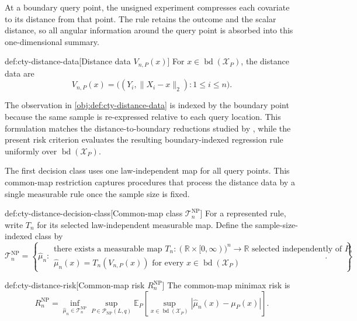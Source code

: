 At a boundary query point, the unsigned experiment compresses each covariate to its distance from that point. The rule retains the outcome and the scalar distance, so all angular information around the query point is absorbed into this one-dimensional summary.

\begin{definitionv}{def:cty-distance-data}[Distance data $V_{n,P}(x)$]
For \(x\in\operatorname{bd}(\mathcal X_P)\), the distance data are
\[
V_{n,P}(x)
=
\bigl((Y_i,\lVert X_i-x\rVert_2):1\leq i\leq n\bigr).
\]
\end{definitionv}

The observation in \cref{obj:def:cty-distance-data} is indexed by the boundary point because the same sample is re-expressed relative to each query location. This formulation matches the distance-to-boundary reductions studied by \citet{CattaneoTitiunikYu2026Distance}, while the present risk criterion evaluates the resulting boundary-indexed regression rule uniformly over \(\operatorname{bd}(\mathcal X_P)\).

The first decision class uses one law-independent map for all query points. This common-map restriction captures procedures that process the distance data by a single measurable rule once the sample size is fixed.

\begin{definitionv}{def:cty-distance-decision-class}[Common-map class $\mathcal T_n^{\mathrm{NP}}$]
For a represented rule, write \(T_n\) for its selected law-independent measurable map. Define the sample-size-indexed class by
\[
\mathcal T_n^{\mathrm{NP}}
=
\left\{
\widehat\mu_n:
\begin{array}{l}
\text{there exists a measurable map }T_n:(\mathbb R\times[0,\infty))^n\to\mathbb R
\text{ selected independently of }P,\\
\widehat\mu_n(x)=T_n(V_{n,P}(x))
\text{ for every }x\in\operatorname{bd}(\mathcal X_P)
\end{array}
\right\}.
\]
\end{definitionv}

\begin{definitionv}{def:cty-distance-risk}[Common-map risk $R_n^{\mathrm{NP}}$]
The common-map minimax risk is
\[
R_n^{\mathrm{NP}}
=
\inf_{\widehat\mu_n\in\mathcal T_n^{\mathrm{NP}}}
\sup_{P\in\mathcal P_{\mathrm{NP}}(L,q)}
\mathbb E_P
\left[
\sup_{x\in\operatorname{bd}(\mathcal X_P)}
|\widehat\mu_n(x)-\mu_P(x)|
\right].
\]
\end{definitionv}

